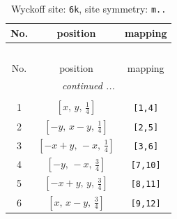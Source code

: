 \documentclass[fleqn,8pt]{jsarticle}
\begin{document}
\renewcommand{\arraystretch}{1.2}
\begin{longtable}{ccc}
\caption{Wyckoff site: {\tt 6k}, site symmetry: {\tt m..}}
 \\
 \hline \hline
No. & position & mapping \\ \hline \endfirsthead

\multicolumn{2}{l}{\tablename\ \thetable{}} \\
 \hline \hline
No. & position & mapping \\ \hline \endhead

 \hline \hline
\multicolumn{2}{r}{\footnotesize\it continued ...} \\ \endfoot

 \hline \hline
\multicolumn{2}{r}{} \\ \endlastfoot

1 & $\left[ x,\, y,\, \frac{1}{4} \right]$ & {\tt [1,4]} \\ \hline
2 & $\left[ - y,\, x - y,\, \frac{1}{4} \right]$ & {\tt [2,5]} \\ \hline
3 & $\left[ - x + y,\, - x,\, \frac{1}{4} \right]$ & {\tt [3,6]} \\ \hline
4 & $\left[ - y,\, - x,\, \frac{3}{4} \right]$ & {\tt [7,10]} \\ \hline
5 & $\left[ - x + y,\, y,\, \frac{3}{4} \right]$ & {\tt [8,11]} \\ \hline
6 & $\left[ x,\, x - y,\, \frac{3}{4} \right]$ & {\tt [9,12]} \\
\end{longtable}
\renewcommand{\arraystretch}{1.2}
\end{document}
